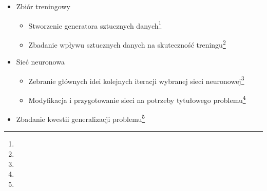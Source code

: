 \begin{itemize}
	\item Zbiór treningowy
		\begin{itemize}
			\item Stworzenie generatora sztucznych danych\footnote{}
			\item Zbadanie wpływu sztucznych danych na skuteczność treningu\footnote{}
		\end{itemize}
	\item Sieć neuronowa
	\begin{itemize}
		\item Zebranie głównych idei kolejnych iteracji wybranej sieci neuronowej\footnote{}
		\item Modyfikacja i przygotowanie sieci na potrzeby tytułowego problemu\footnote{}
	\end{itemize}
	\item Zbadanie kwestii generalizacji problemu\footnote{}
\end{itemize}

